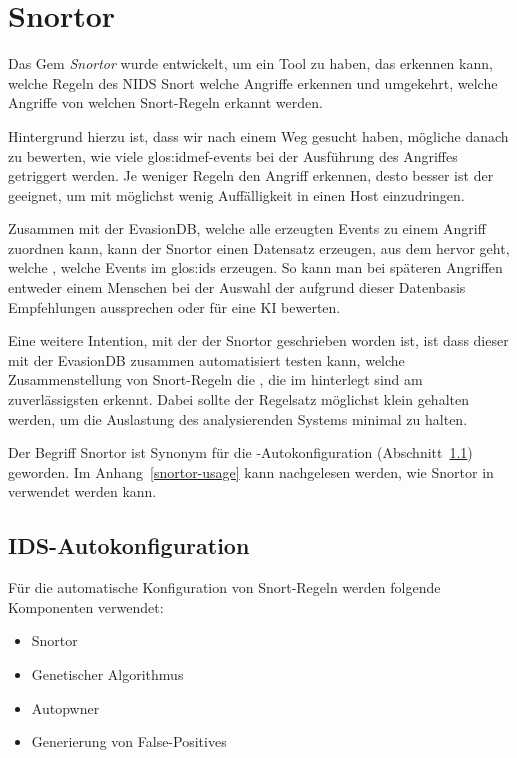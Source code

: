 \section{Snortor}
\label{snortor}
\authors{\BK \and \DE \and \DK}{\LM \and \MW}

Das Gem \textit{Snortor} wurde entwickelt, um ein Tool zu haben, das erkennen
kann, welche Regeln des NIDS Snort welche Angriffe erkennen und
umgekehrt, welche Angriffe von welchen Snort-Regeln erkannt werden.

Hintergrund hierzu ist, dass wir nach einem Weg gesucht haben,
mögliche  danach zu bewerten, wie viele \glspl{glos:idmef-event} bei der
Ausführung des Angriffes getriggert werden. Je weniger Regeln den
Angriff erkennen, desto besser ist der  geeignet, um mit
möglichst wenig Auffälligkeit in einen Host einzudringen.

Zusammen mit der EvasionDB, welche alle erzeugten Events zu einem
Angriff zuordnen kann, kann der Snortor einen Datensatz erzeugen, aus
dem hervor geht, welche , welche Events im \gls{glos:ids}
erzeugen. So kann man bei späteren Angriffen entweder einem Menschen
bei der Auswahl der  aufgrund dieser Datenbasis Empfehlungen
aussprechen oder  für eine KI bewerten.

Eine weitere Intention, mit der der Snortor geschrieben worden ist,
ist dass dieser mit der EvasionDB zusammen automatisiert testen kann,
welche Zusammenstellung von Snort-Regeln die , die im
 hinterlegt sind am zuverlässigsten erkennt. Dabei
sollte der Regelsatz möglichst klein gehalten werden, um die
Auslastung des analysierenden Systems minimal zu halten.

Der Begriff Snortor ist Synonym für die -Autokonfiguration
(Abschnitt~\ref{ids-autoconfig}) geworden. Im Anhang~\ref{snortor-usage}
kann nachgelesen werden, wie Snortor in  verwendet werden kann.

\subsection{IDS-Autokonfiguration}
\label{ids-autoconfig}

Für die automatische Konfiguration von Snort-Regeln werden folgende
Komponenten verwendet:

\begin{itemize}
  \item Snortor
  \item Genetischer Algorithmus
  \item Autopwner
  \item Generierung von False-Positives
\end{itemize}

